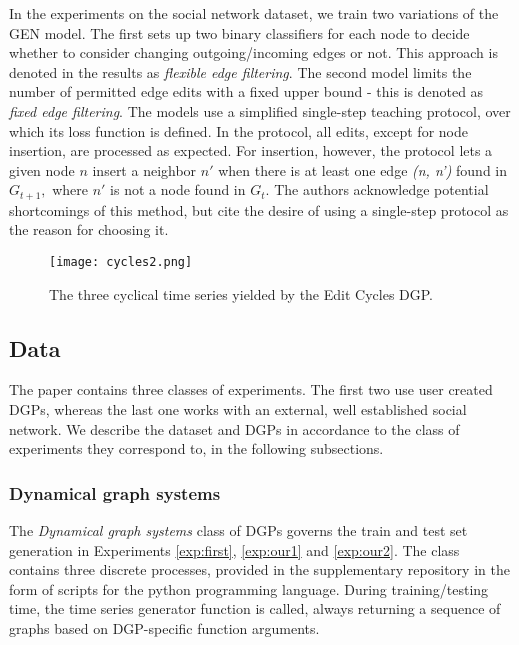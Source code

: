 In the experiments on the social network dataset, we train two variations of the GEN model. The first sets up two binary classifiers for each node to decide whether to consider changing outgoing/incoming edges or not. This approach is denoted in the results as \textit{flexible edge filtering}. The second model limits the number of permitted edge edits with a fixed upper bound - this is denoted as \textit{fixed edge filtering}. 
The models use a simplified single-step teaching protocol, over which its loss function is defined. In the protocol, all edits, except for node insertion, are processed as expected. For insertion, however, the protocol lets a given node $n$ insert a neighbor $n'$ when there is at least one edge \textit{(n, n')} found in $G_{t+1},$ where $n'$ is not a node found in $G_{t}.$ The authors acknowledge potential shortcomings of this method, but cite the desire of using a single-step protocol as the reason for choosing it.




\begin{figure}
    \centering
    
    \texttt{[image: cycles2.png]}
    \caption{The three cyclical time series yielded by the Edit Cycles DGP.}
    \label{fig:Cyclical}
\end{figure}
\subsection{Data}
The paper contains three classes of experiments. The first two use user created DGPs, whereas the last one works with an external, well established social network. We describe the dataset and DGPs in accordance to the class of experiments they correspond to, in the following subsections.

\subsubsection{Dynamical graph systems}
\label{sec:DGS}
The \textit{Dynamical graph systems} class of DGPs governs the train and test set generation in Experiments \ref{exp:first}, \ref{exp:our1} and \ref{exp:our2}. The class contains three discrete processes, provided in the supplementary repository in the form of scripts for the python programming language. During training/testing time, the time series generator function is called, always returning a sequence of graphs based on DGP-specific function arguments.

